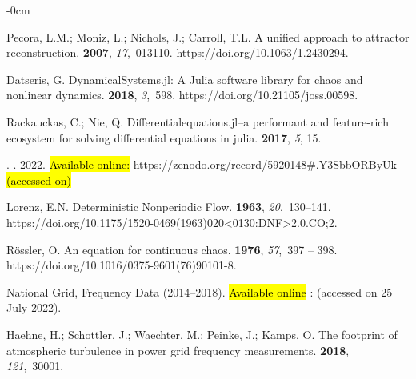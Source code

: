 \documentclass[entropy,article,accept,pdftex,moreauthors]{Definitions/mdpi}
\begin{document}
\begin{adjustwidth}{-\extralength}{0cm}
\begin{thebibliography}{999}
Pecora, L.M.; Moniz, L.; Nichols, J.; Carroll, T.L.
\newblock A unified approach to attractor reconstruction.
 {\bf
  2007}, {\em 17},~013110.
\newblock
  {https://doi.org/10.1063/1.2430294}.

Datseris, G.
\newblock DynamicalSystems.jl: A Julia software library for chaos and nonlinear
  dynamics.
 {\bf 2018}, {\em 3},~598.
\newblock
  {https://doi.org/10.21105/joss.00598}.

Rackauckas, C.; Nie, Q.
\newblock Differentialequations.jl--a performant and feature-rich ecosystem for
  solving differential equations in julia.
 {\bf 2017}, {\em 5}, 15.

.
. {2022}.
\newblock
   \hl{Available online:} %
 \url{https://zenodo.org/record/5920148\#.Y3SbbORByUk} \hl{(accessed on)} %


Lorenz, E.N.
\newblock Deterministic Nonperiodic Flow.
 {\bf 1963}, {\em
  20},~130--141.
\newblock
  {https://doi.org/10.1175/1520-0469(1963)020<0130:DNF>2.0.CO;2}.

Rössler, O.
\newblock An equation for continuous chaos.
 {\bf 1976}, {\em 57},~397 -- 398.
\newblock
  {https://doi.org/10.1016/0375-9601(76)90101-8}.

National Grid, Frequency Data (2014–2018).
\newblock  \hl{Available online}%
:  (accessed on 25 July 2022).

Haehne, H.; Schottler, J.; Waechter, M.; Peinke, J.; Kamps, O.
\newblock The footprint of atmospheric turbulence in power grid frequency
  measurements.
 {\bf 2018}, {\em 121},~30001.


\end{thebibliography}
\end{adjustwidth}
\end{document}
